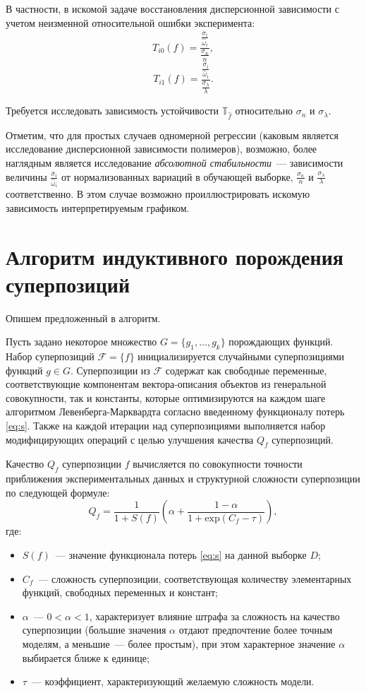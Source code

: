 \documentclass[11pt,a4paper]{article}
\theoremstyle{definition}
\begin{document}
В частности, в искомой задаче восстановления дисперсионной зависимости с учетом неизменной
относительной ошибки эксперимента:
\[
  T_{i0}(f) = \frac{\frac{\overline{\sigma}_i}{\hat{\omega}_i}}{\frac{\sigma_n}{n}},
\]
\[
  T_{i1}(f) = \frac{\frac{\overline{\sigma}_i}{\hat{\omega}_i}}{\frac{\sigma_{\lambda}}{\lambda}}.
\]

Требуется исследовать зависимость устойчивости $\mathbb{T}_{\hat{f}}$ относительно
$\sigma_n$ и $\sigma_{\lambda}$.

Отметим, что для простых случаев одномерной регрессии (каковым является исследование
дисперсионной зависимости полимеров), возможно, более наглядным является исследование
\emph{абсолютной стабильности}~--- зависимости величины
$\frac{\overline{\sigma}_i}{\hat{\omega}_i}$ от нормализованных вариаций в обучающей
выборке, $\frac{\sigma_n}{n}$ и $\frac{\sigma_{\lambda}}{\lambda}$ соответственно.
В этом случае возможно проиллюстрировать искомую зависимость интерпретируемым графиком.

\section{Алгоритм индуктивного порождения суперпозиций}

Опишем предложенный в \cite{Rudoy13} алгоритм.

Пусть задано некоторое множество $G = \{ g_1, \dots, g_k \}$ 
порождающих функций. Набор суперпозиций $\mathcal{F} = \{ f \}$
инициализируется случайными суперпозициями функций $g \in G$. Суперпозиции из
$\mathcal{F}$ содержат как свободные переменные, соответствующие
компонентам вектора-описания объектов из генеральной совокупности, так и
константы, которые оптимизируются на каждом шаге алгоритмом Левенберга-Марквардта
согласно введенному функционалу потерь \eqref{eq:s}. Также на каждой итерации
над суперпозициями выполняется набор модифицирующих операций с целью улучшения
качества $Q_f$ суперпозиций.

Качество $Q_f$ суперпозиции $f$ вычисляется по совокупности точности приближения
экспериментальных данных и структурной сложности суперпозиции по следующей формуле:
\begin{equation}
  Q_f = \frac{1}{1 + S(f)} \left(\alpha + \frac{1 - \alpha}{1 + \text{exp} (C_f - \tau)}\right),
  \label{eq:s_f}
\end{equation}
где:
\begin{itemize}
  \item[] $S(f)$~--- значение функционала потерь \eqref{eq:s} на данной выборке $D$;
  \item[] $C_f$~--- сложность суперпозиции, соответствующая количеству элементарных
	функций, свободных переменных и констант;
  \item[] $\alpha$~--- $0 < \alpha < 1$, характеризует влияние штрафа за сложность
	на качество суперпозиции (большие значения $\alpha$ отдают предпочтение более
	точным моделям, а меньшие~--- более простым), при этом характерное значение
	$\alpha$ выбирается ближе к единице;
  \item[] $\tau$~--- коэффициент, характеризующий желаемую сложность модели.
\end{itemize}
\end{document}
